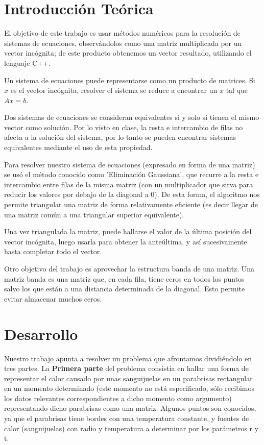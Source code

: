 \documentclass[spanish,a4paper]{article}
\begin{document}
\newpage

\section{Introducci\'{o}n Te\'{o}rica}
\label{sec:intro}

El objetivo de este trabajo es usar métodos numéricos para la resolución de sistemas de ecuaciones, observándolos como una matriz multiplicada por un vector incógnita; de este producto obtenemos un vector resultado, utilizando el lenguaje C++.

Un sistema de ecuaciones puede representarse como un producto de matrices. Si $x$ es el vector incógnita, resolver el sistema se reduce a encontrar un $x$ tal que $Ax=b$.          

Dos sistemas de ecuaciones se consideran equivalentes si y solo si tienen el mismo vector como solución. Por lo visto en clase, la resta e intercambio de filas no afecta a la solución del sistema, por lo tanto se pueden encontrar sistemas equivalentes mediante el uso de esta propiedad.

Para resolver nuestro sistema de ecuaciones (expresado en forma de una matriz) se usó el método conocido como 'Eliminación Gaussiana', que recurre a la resta e intercambio entre filas de la misma matriz (con un multiplicador que sirva para reducir los valores por debajo de la diagonal a 0). De esta forma, el algoritmo nos permite triangular una matriz de forma relativamente eficiente (es decir llegar de una matriz común a una triangular superior equivalente).

Una vez triangulada la matriz, puede hallarse el valor de la última posición del vector incógnita, luego usarla para obtener la anteúltima, y así sucesivamente hasta completar todo el vector.

Otro objetivo del trabajo es aprovechar la estructura banda de una matriz. Una matriz banda es una matriz que, en cada fila, tiene ceros en todos los puntos salvo los que están a una distancia determinada de la diagonal. Esto permite evitar almacenar muchos ceros.

\newpage

\section{Desarrollo}
\label{sec:desarrollo}

Nuestro trabajo apunta a resolver un problema que afrontamos dividiéndolo en tres partes. \newline \newline
La \textbf{Primera parte} del problema consistía en hallar una forma de representar el calor causado por unas sanguijuelas en un parabrisas rectangular en un momento determinado (este momento no está especificado, sólo recibimos los datos relevantes correspondientes a dicho momento como argumento) representando dicho parabrisas como una matriz. Algunos puntos son conocidos, ya que el parabrisas tiene bordes con una temperatura constante, y fuentes de calor (sanguijuelas) con radio y temperatura a determinar por los parámetros r y t.
\end{document}

